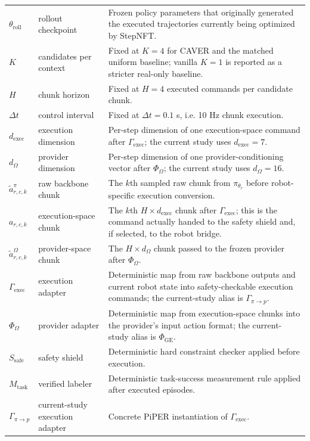 \documentclass[10pt]{article}
\theoremstyle{plain}
\theoremstyle{definition}
\theoremstyle{remark}
\begin{document}
{\begin{longtable}{@{}>{\raggedright\arraybackslash}p{3.25cm}>{\raggedright\arraybackslash}p{2.55cm}>{\raggedright\arraybackslash}p{8.35cm}@{}}
$\theta_{\mathrm{roll}}$ & rollout checkpoint & Frozen policy parameters that originally generated the executed trajectories currently being optimized by StepNFT. \\
$K$ & candidates per context & Fixed at $K=4$ for CAVER and the matched uniform baseline; vanilla $K=1$ is reported as a stricter real-only baseline. \\
$H$ & chunk horizon & Fixed at $H=4$ executed commands per candidate chunk. \\
$\Delta t$ & control interval & Fixed at $\Delta t=0.1$ s, i.e. 10 Hz chunk execution. \\
$d_{\mathrm{exec}}$ & execution dimension & Per-step dimension of one execution-space command after $\Gamma_{\mathrm{exec}}$; the current study uses $d_{\mathrm{exec}}=7$. \\
$d_{\Omega}$ & provider dimension & Per-step dimension of one provider-conditioning vector after $\Phi_{\Omega}$; the current study uses $d_{\Omega}=16$. \\
$\tilde a^{\pi}_{r,c,k}$ & raw backbone chunk & The $k$th sampled raw chunk from $\pi_{\theta_r}$ before robot-specific execution conversion. \\
$a_{r,c,k}$ & execution-space chunk & The $k$th $H\times d_{\mathrm{exec}}$ chunk after $\Gamma_{\mathrm{exec}}$; this is the command actually handed to the safety shield and, if selected, to the robot bridge. \\
$\tilde a^{\Omega}_{r,c,k}$ & provider-space chunk & The $H\times d_{\Omega}$ chunk passed to the frozen provider after $\Phi_{\Omega}$. \\
$\Gamma_{\mathrm{exec}}$ & execution adapter & Deterministic map from raw backbone outputs and current robot state into safety-checkable execution commands; the current-study alias is $\Gamma_{\pi\rightarrow p}$. \\
$\Phi_{\Omega}$ & provider adapter & Deterministic map from execution-space chunks into the provider's input action format; the current-study alias is $\Phi_{\mathrm{GE}}$. \\
$S_{\mathrm{safe}}$ & safety shield & Deterministic hard constraint checker applied before execution. \\
$M_{\mathrm{task}}$ & verified labeler & Deterministic task-success measurement rule applied after executed episodes. \\
$\Gamma_{\pi\rightarrow p}$ & current-study execution adapter & Concrete PiPER instantiation of $\Gamma_{\mathrm{exec}}$. \\

\end{longtable}}
\end{document}
